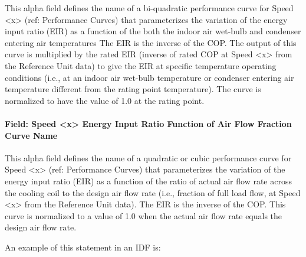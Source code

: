 This alpha field defines the name of a bi-quadratic performance curve for Speed \textless{}x\textgreater{} (ref: Performance Curves) that parameterizes the variation of the energy input ratio (EIR) as a function of the both the indoor air wet-bulb and condenser entering air temperatures The EIR is the inverse of the COP. The output of this curve is multiplied by the rated EIR (inverse of rated COP at Speed \textless{}x\textgreater{} from the Reference Unit data) to give the EIR at specific temperature operating conditions (i.e., at an indoor air wet-bulb temperature or condenser entering air temperature different from the rating point temperature). The curve is normalized to have the value of 1.0 at the rating point.

\paragraph{Field: Speed \textless{}x\textgreater{} Energy Input Ratio Function of Air Flow Fraction Curve Name}\label{field-speed-x-energy-input-ratio-function-of-air-flow-fraction-curve-name}

This alpha field defines the name of a quadratic or cubic performance curve for Speed \textless{}x\textgreater{} (ref: Performance Curves) that parameterizes the variation of the energy input ratio (EIR) as a function of the ratio of actual air flow rate across the cooling coil to the design air flow rate (i.e., fraction of full load flow, at Speed \textless{}x\textgreater{} from the Reference Unit data). The EIR is the inverse of the COP. This curve is normalized to a value of 1.0 when the actual air flow rate equals the design air flow rate.

An example of this statement in an IDF is:

